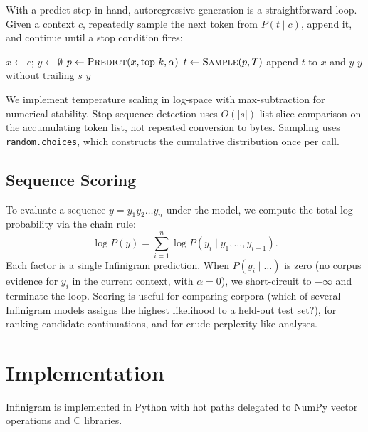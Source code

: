 \documentclass[11pt]{article}
\begin{document}
With a predict step in hand, autoregressive generation is a straightforward loop. Given a context $c$, repeatedly sample the next token from $P(t \mid c)$, append it, and continue until a stop condition fires:

\begin{algorithmic}[1]
    \State $x \gets c$; $y \gets \emptyset$
        \State $p \gets \Call{Predict}{x, \text{top-}k, \alpha}$
        \State $t \gets \Call{Sample}{p, T}$ 
        \State append $t$ to $x$ and $y$
                \State \Return $y$ without trailing $s$
            \EndIf
        \EndFor
    \EndFor
    \State \Return $y$
\EndFunction
\end{algorithmic}

We implement temperature scaling in log-space with max-subtraction for numerical stability. Stop-sequence detection uses $O(|s|)$ list-slice comparison on the accumulating token list, not repeated conversion to bytes. Sampling uses \texttt{random.choices}, which constructs the cumulative distribution once per call.

\subsection{Sequence Scoring}

To evaluate a sequence $y = y_1 y_2 \ldots y_n$ under the model, we compute the total log-probability via the chain rule:
\begin{equation}
    \log P(y) = \sum_{i=1}^{n} \log P(y_i \mid y_1, \ldots, y_{i-1}).
\end{equation}
Each factor is a single Infinigram prediction. When $P(y_i \mid \ldots)$ is zero (no corpus evidence for $y_i$ in the current context, with $\alpha = 0$), we short-circuit to $-\infty$ and terminate the loop. Scoring is useful for comparing corpora (which of several Infinigram models assigns the highest likelihood to a held-out test set?), for ranking candidate continuations, and for crude perplexity-like analyses.

\section{Implementation}

Infinigram is implemented in Python with hot paths delegated to NumPy vector operations and C libraries.
\end{document}
